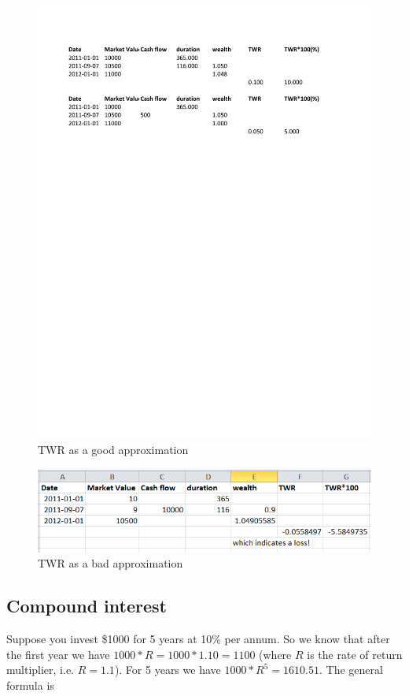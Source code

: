 \documentclass[runningheads,12pt]{article}
\begin{document}
\begin{figure}[!]
\centering
\includegraphics[scale=0.8]{inputs/twr.pdf}
\caption{TWR as a good approximation}
\label{fig:twr}
\end{figure}

\begin{figure}[!]
\centering
\includegraphics[scale=2.3]{inputs/bad-twr.png}
\caption{TWR as a bad approximation}
\label{fig:bad-twr}
\end{figure}

\subsection{Compound interest}
Suppose you invest \$1000 for 5 years at 10\% per annum. So we know that after the first year we have $1000*R = 1000*1.10 = 1100$ (where $R$ is the rate of return multiplier, i.e. $R=1.1$). For 5 years we have $1000*R^5 = 1610.51$. The general formula is
\end{document}
